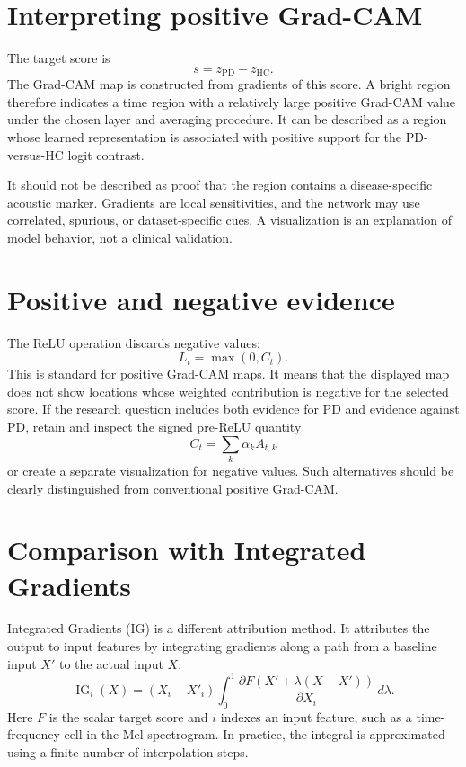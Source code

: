 \documentclass[11pt,a4paper]{article}
\begin{document}
\section{Interpreting positive Grad-CAM}
The target score is
\[
s=z_{\mathrm{PD}}-z_{\mathrm{HC}}.
\]
The Grad-CAM map is constructed from gradients of this score. A bright region therefore indicates a time region with a relatively large positive Grad-CAM value under the chosen layer and averaging procedure. It can be described as a region whose learned representation is associated with positive support for the PD-versus-HC logit contrast.

It should not be described as proof that the region contains a disease-specific acoustic marker. Gradients are local sensitivities, and the network may use correlated, spurious, or dataset-specific cues. A visualization is an explanation of model behavior, not a clinical validation.

\section{Positive and negative evidence}
The ReLU operation discards negative values:
\[
L_t=\max(0,C_t).
\]
This is standard for positive Grad-CAM maps. It means that the displayed map does not show locations whose weighted contribution is negative for the selected score. If the research question includes both evidence for PD and evidence against PD, retain and inspect the signed pre-ReLU quantity
\[
C_t=\sum_k\alpha_k A_{t,k}
\]
or create a separate visualization for negative values. Such alternatives should be clearly distinguished from conventional positive Grad-CAM.

\section{Comparison with Integrated Gradients}
Integrated Gradients (IG) is a different attribution method. It attributes the output to input features by integrating gradients along a path from a baseline input $X'$ to the actual input $X$:
\[
\operatorname{IG}_i(X)=
(X_i-X'_i)\int_0^1
\frac{\partial F(X'+\lambda(X-X'))}{\partial X_i}
\,d\lambda.
\]
Here $F$ is the scalar target score and $i$ indexes an input feature, such as a time-frequency cell in the Mel-spectrogram. In practice, the integral is approximated using a finite number of interpolation steps.
\end{document}
